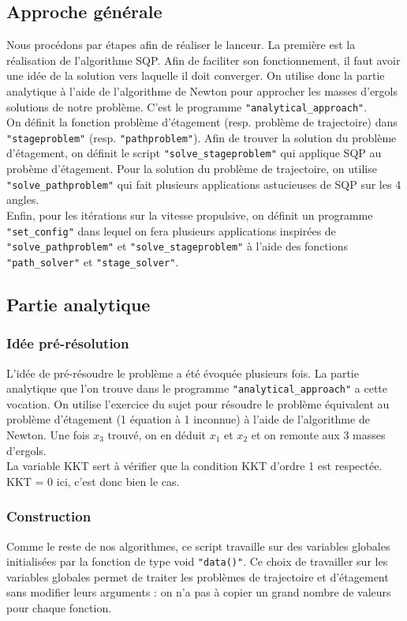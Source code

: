 \subsection{Approche générale}\medbreak

Nous procédons par étapes afin de réaliser le lanceur. La première est la réalisation de l'algorithme SQP. Afin de faciliter son fonctionnement, il faut avoir une idée de la solution vers laquelle il doit converger. On utilise donc la partie analytique à l'aide de l'algorithme de Newton pour approcher les masses d'ergols solutions de notre problème. C'est le programme \texttt{"analytical\_approach"}.\\
On définit la fonction problème d'étagement (resp. problème de trajectoire) dans \texttt{"stageproblem"} (resp. \texttt{"pathproblem"}). Afin de trouver la solution du problème d'étagement, on définit le script \texttt{"solve\_stageproblem"} qui applique SQP au probème d'étagement. Pour la solution du problème de trajectoire, on utilise \texttt{"solve\_pathproblem"} qui fait plusieurs applications astucieuses de SQP sur les 4 angles.\\
Enfin, pour les itérations sur la vitesse propulsive, on définit un programme \texttt{"set\_config"} dans lequel on fera plusieurs applications inspirées de \texttt{"solve\_pathproblem"} et \texttt{"solve\_stageproblem"} à l'aide des fonctions \texttt{"path\_solver"} et \texttt{"stage\_solver"}.\bigbreak


\subsection{Partie analytique}\medbreak

\subsubsection{Idée pré-résolution}\medbreak
L'idée de pré-résoudre le problème a été évoquée plusieurs fois. La partie analytique que l'on trouve dans le programme \texttt{"analytical\_approach"} a cette vocation. On utilise l'exercice du sujet pour résoudre le problème équivalent au problème d'étagement (1 équation à 1 inconnue) à l'aide de l'algorithme de Newton. Une fois $x_3$ trouvé, on en déduit $x_1$ et $x_2$ et on remonte aux 3 masses d'ergols.\\
La variable KKT sert à vérifier que la condition KKT d'ordre 1 est respectée. KKT = 0 ici, c'est donc bien le cas.\medbreak
\subsubsection{Construction}\medbreak
Comme le reste de nos algorithmes, ce script travaille sur des variables globales initialisées par la fonction de type void \texttt{"data()"}. Ce choix de travailler sur les variables globales permet de traiter les problèmes de trajectoire et d'étagement sans modifier leurs arguments : on n'a pas à copier un grand nombre de valeurs pour chaque fonction.\bigbreak




